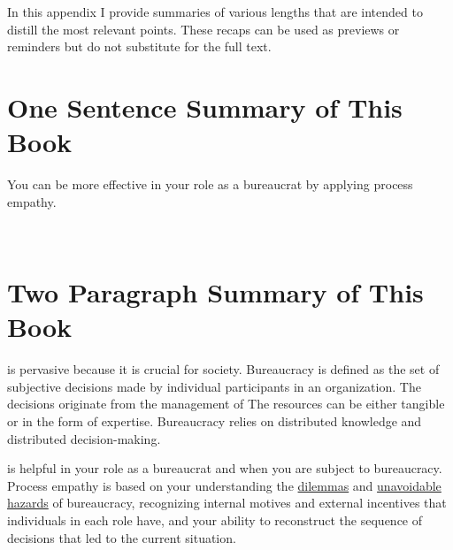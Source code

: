In this appendix I provide summaries of various lengths that are intended to distill the most relevant points. These recaps can be used as previews or reminders but do not substitute for the full text.

\section*{One Sentence Summary of This Book}

You can be more effective in your role as a \gls{bureaucrat} by applying \gls{process empathy}.

\ \\

\section*{Two Paragraph Summary of This Book}


\iftoggle{glossarysubstitutionworks}{\Gls{bureaucracy}}{Bureaucracy} is pervasive because it is crucial for society. Bureaucracy is defined as the set of subjective decisions made by individual participants in an organization. The decisions originate from the 
management of \iftoggle{glossarysubstitutionworks}{\glspl{shared resource}.}{shared resources.} 
The resources can be either tangible or in the form of expertise. Bureaucracy relies on
distributed knowledge and distributed decision-making.

\iftoggle{glossarysubstitutionworks}{\Gls{process empathy}}{Process empathy} 
is helpful in your role as a bureaucrat and when you are subject to bureaucracy. 
Process empathy is based on your understanding the \hyperref[sec:dilemma-trilemma]{dilemmas} and \hyperref[sec:unavoidable-hazards]{unavoidable hazards} of bureaucracy, recognizing internal \gls{motives} and external \gls{incentives} that individuals in each role have, and your ability to reconstruct the sequence of decisions that led to the current situation. 





